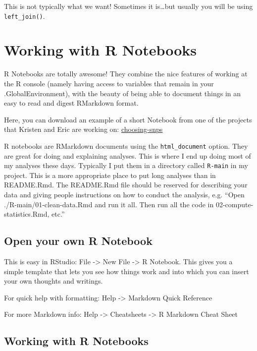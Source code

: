 \documentclass[]{book}
\theoremstyle{definition}
\theoremstyle{definition}
\theoremstyle{remark}
\begin{document}
This is not typically what we want! Sometimes it is\ldots{}but usually
you will be using \texttt{left\_join()}.

\section{Working with R Notebooks}\label{working-with-r-notebooks}

R Notebooks are totally awesome! They combine the nice features of
working at the R console (namely having access to variables that remain
in your .GlobalEnvironment), with the beauty of being able to document
things in an easy to read and digest RMarkdown format.

Here, you can download an example of a short Notebook from one of the
projects that Kristen and Eric are working on:
\href{https://www.dropbox.com/s/buq39n64m8524ff/02-choosing-96-SNPs.nb.html?dl=1}{choosing-snps}

R notebooks are RMarkdown documents using the \texttt{html\_document}
option. They are great for doing and explaining analyses. This is where
I end up doing most of my analyses these days. Typically I put them in a
directory called \texttt{R-main} in my project. This is a more
appropriate place to put long analyses than in README.Rmd. The
README.Rmd file should be reserved for describing your data and giving
people instructions on how to conduct the analysis, e.g. ``Open
./R-main/01-clean-data.Rmd and run it all. Then run all the code in
02-compute-statistics.Rmd, etc.''

\subsection{Open your own R Notebook}\label{open-your-own-r-notebook}

This is easy in RStudio: File -\textgreater{} New File -\textgreater{} R
Notebook. This gives you a simple template that lets you see how things
work and into which you can insert your own thoughts and writings.

For quick help with formatting: Help -\textgreater{} Markdown Quick
Reference

For more Markdown info: Help -\textgreater{} Cheatsheets -\textgreater{}
R Markdown Cheat Sheet

\subsection{Working with R Notebooks}\label{working-with-r-notebooks-1}
\end{document}
